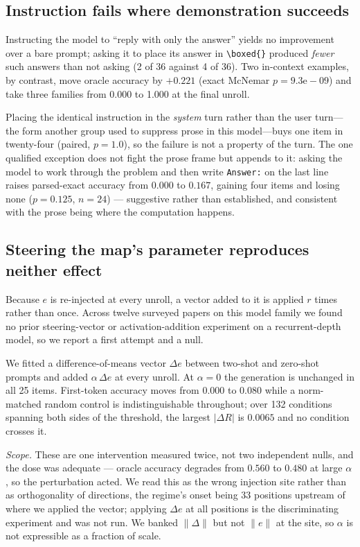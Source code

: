 \documentclass{zapiski}
\begin{document}
\subsection{Instruction fails where demonstration succeeds}

Instructing the model to ``reply with only the answer'' yields no improvement over a bare prompt;
asking it to place its answer in \verb|\boxed{}| produced \emph{fewer} such answers than not
asking (2 of 36 against 4 of 36). Two in-context examples, by contrast, move oracle accuracy by
$+0.221$ (exact McNemar $p = 9.3\mathrm{e}{-}09$) and take three families from 0.000 to 1.000 at
the final unroll.

Placing the identical instruction in the \emph{system} turn rather than the user turn---the form
another group used to suppress prose in this model---buys one item in twenty-four (paired,
$p = 1.0$), so the failure is not a property of the turn. The one qualified exception does not
fight the prose frame but appends to it: asking the model to work through the problem and then
write \texttt{Answer:} on the last line raises parsed-exact accuracy from $0.000$ to $0.167$,
gaining four items and losing none ($p = 0.125$, $n = 24$) --- suggestive rather than established,
and consistent with the prose being where the computation happens.

\subsection{Steering the map's parameter reproduces neither effect}

Because $e$ is re-injected at every unroll, a vector added to it is applied $r$ times rather than
once. Across twelve surveyed papers on this model family we found no prior steering-vector or
activation-addition experiment on a recurrent-depth model, so we report a first attempt and a null.

We fitted a difference-of-means vector $\Delta e$ between two-shot and zero-shot prompts and added
$\alpha\,\Delta e$ at every unroll. At $\alpha = 0$ the generation is unchanged in all 25 items.
First-token accuracy moves from $0.000$ to $0.080$ while a norm-matched random control is
indistinguishable throughout; over 132 conditions spanning both sides of the threshold, the largest
$|\Delta R|$ is $0.0065$ and no condition crosses it.

\emph{Scope.} These are one intervention measured twice, not two independent nulls, and the dose
was adequate --- oracle accuracy degrades from $0.560$ to $0.480$ at large $\alpha$, so the
perturbation acted. We read this as the wrong injection site rather than as orthogonality of
directions, the regime's onset being 33 positions upstream of where we applied the vector; applying
$\Delta e$ at all positions is the discriminating experiment and was not run. We banked
$\|\Delta\|$ but not $\|e\|$ at the site, so $\alpha$ is not expressible as a fraction of scale.
\end{document}
